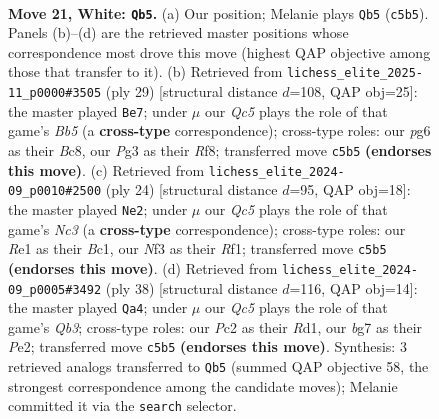 \documentclass[11pt]{article}
\begin{document}
\clearpage

\begin{figure}[p]\centering
\begin{subfigure}{0.46\textwidth}\centering
\resizebox{\linewidth}{!}{%
\newchessgame
\chessboard[
  setfen={rnb1r1k1/pp2qpb1/4pnp1/2Qp3p/P2P3P/1B2BNP1/RPP2P1K/1N2R3 w - - 5 21},
  showmover=false,
  pgfstyle=straightmove, color=movearrow, markmove={c5-b5}
]}
\caption{}
\end{subfigure}\hfill
\begin{subfigure}{0.46\textwidth}\centering
\resizebox{\linewidth}{!}{%
\newchessgame
\chessboard[
  setfen={r1b2rk1/1pq2p1p/n1p3p1/5p2/PbNP4/P2BPN2/2Q2PPP/RR4K1 b - - 0 15},
  showmover=false,
  pgfstyle=straightmove, color=movearrow, markmove={b4-e7}
]}
\caption{}
\end{subfigure}
\\[4pt]
\begin{subfigure}{0.46\textwidth}\centering
\resizebox{\linewidth}{!}{%
\newchessgame
\chessboard[
  setfen={r2q1rk1/1b2ppbp/p1np1np1/8/1p2PP1Q/2NB1N2/PPP3PP/R1B2R1K w - - 0 13},
  showmover=false,
  pgfstyle=straightmove, color=movearrow, markmove={c3-e2}
]}
\caption{}
\end{subfigure}\hfill
\begin{subfigure}{0.46\textwidth}\centering
\resizebox{\linewidth}{!}{%
\newchessgame
\chessboard[
  setfen={r1r2nk1/p3qpp1/bp2pn1p/3p4/3P1B2/1QN2PP1/PP2P1BP/R2R2K1 w - - 1 20},
  showmover=false,
  pgfstyle=straightmove, color=movearrow, markmove={b3-a4}
]}
\caption{}
\end{subfigure}
\caption{\textbf{Move 21, White: \texttt{Qb5}.} (a) Our position; Melanie plays \texttt{Qb5} (\texttt{c5b5}). Panels (b)--(d) are the retrieved master positions whose correspondence most drove this move (highest QAP objective among those that transfer to it). (b) Retrieved from \texttt{lichess\_elite\_2025-11\_p0000\#3505} (ply 29) [structural distance $d$=108, QAP obj=25]: the master played \texttt{Be7}; under $\mu$ our \emph{Qc5} plays the role of that game's \emph{Bb5} (a \textbf{cross-type} correspondence); cross-type roles: our \emph{p}g6 as their \emph{B}c8, our \emph{P}g3 as their \emph{R}f8; transferred move \texttt{c5b5} \textbf{(endorses this move)}. (c) Retrieved from \texttt{lichess\_elite\_2024-09\_p0010\#2500} (ply 24) [structural distance $d$=95, QAP obj=18]: the master played \texttt{Ne2}; under $\mu$ our \emph{Qc5} plays the role of that game's \emph{Nc3} (a \textbf{cross-type} correspondence); cross-type roles: our \emph{R}e1 as their \emph{B}c1, our \emph{N}f3 as their \emph{R}f1; transferred move \texttt{c5b5} \textbf{(endorses this move)}. (d) Retrieved from \texttt{lichess\_elite\_2024-09\_p0005\#3492} (ply 38) [structural distance $d$=116, QAP obj=14]: the master played \texttt{Qa4}; under $\mu$ our \emph{Qc5} plays the role of that game's \emph{Qb3}; cross-type roles: our \emph{P}c2 as their \emph{R}d1, our \emph{b}g7 as their \emph{P}e2; transferred move \texttt{c5b5} \textbf{(endorses this move)}. Synthesis: 3 retrieved analogs transferred to \texttt{Qb5} (summed QAP objective 58, the strongest correspondence among the candidate moves); Melanie committed it via the \texttt{search} selector.}

\end{figure}
\end{document}
